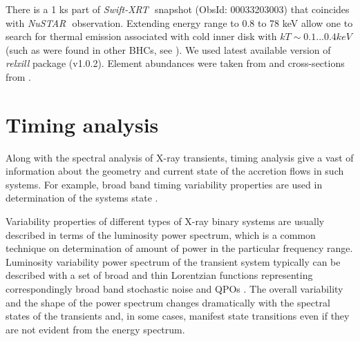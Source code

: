 \documentclass[a4paper,fleqn,usenatbib]{mnras}
\def\swiftx{{\em Swift-XRT\,}}
\def\nustar{{\em NuSTAR\,}}
\begin{document}
There is a 1 ks part of \swiftx\, snapshot (ObsId: 00033203003) that coincides with \nustar\, observation.  Extending energy range to 0.8 to 78 keV allow one to search for thermal emission associated with cold inner disk with $kT \sim 0.1...0.4 keV$ (such as were found in other BHCs, see \cite[][ e.t.c]{miller06b,miller06a,parker15}).
We used latest available version of {\it relxill} package (v1.0.2). 
Element abundances were taken from \cite{wilms00} and cross-sections from \cite{verner96}.




\section{Timing analysis} 

    Along with the spectral analysis of X-ray transients, timing analysis give a vast of information about the geometry and current state of the accretion flows in such systems. 
For example, broad band timing variability properties are used in determination of the systems state \cite{2005Ap&SS.300..107H}.

    Variability properties of different types of X-ray binary systems are usually described in terms of the luminosity power spectrum, which is a common technique on determination of amount of power in the particular frequency range.
    Luminosity variability power spectrum of the transient system typically can be described with a set of broad and thin Lorentzian functions representing correspondingly broad band stochastic noise and QPOs \citep[see, e.g.][]{1972ApJ...174L..35T, 1990A&A...227L..33B}.
    The overall variability and the shape of the power spectrum changes dramatically with the spectral states of the transients and, in some cases, manifest state transitions even if they are not evident from the energy spectrum.
\end{document}
